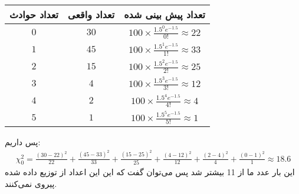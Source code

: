 \begin{enumerate}
\begin{center}
\begin{tabular}{|c|c|c|}
            \hline
            تعداد حوادث & تعداد واقعی & تعداد پیش بینی شده\\
            \hline
            $0$ & $30$ & $100 \times \frac{1.5^0 e^{-1.5}}{0!} \approx 22$\\
            \hline
            $1$ & $45$ & $100 \times \frac{1.5^1 e^{-1.5}}{1!} \approx 33$ \\
            \hline
            $2$ & $15$ & $100 \times \frac{1.5^2 e^{-1.5}}{2!} \approx 25$ \\
            \hline
            $3$ & $4$ & $100 \times \frac{1.5^3 e^{-1.5}}{3!} \approx 12$ \\
            \hline
            $4$ & $2$ & $100 \times \frac{1.5^4 e^{-1.5}}{4!} \approx 4$ \\
            \hline
            $5$ & $1$ & $100 \times \frac{1.5^5 e^{-1.5}}{5!} \approx 1$ \\
            \hline
        \end{tabular}
    \end{center}
    پس داریم:
    \begin{gather*}
        \chi^2_0 = \frac{(30 - 22)^2}{22} + \frac{(45 - 33)^2}{33} + \frac{(15 - 25)^2}{25} + \frac{(4 - 12)^2}{12} + \frac{(2 - 4)^2}{4} + \frac{(0 - 1)^2}{1} \approx 18.6
    \end{gather*}
    این بار عدد ما از 11 بیشتر شد پس می‌توان گفت که این این اعداد از توزیع داده شده پیروی نمی‌کنند.
\end{enumerate}